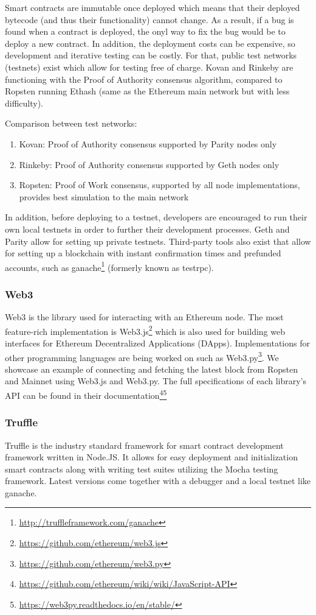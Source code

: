 Smart contracts are immutable once deployed which means that their deployed bytecode (and thus their functionality) cannot change. As a result, if a bug is found when a contract is deployed, the onyl way to fix the bug would be to deploy a new contract. In addition, the deployment costs can be expensive, so development and iterative testing can be costly. For that, public test networks (testnets) exist which allow for testing free of charge. Kovan and Rinkeby are functioning with the Proof of Authority \cite{poa} consensus algorithm, compared to Ropsten running Ethash \cite{ethash} (same as the Ethereum main network but with less difficulty). 

Comparison between test networks:
\begin{enumerate}
    \item Kovan: Proof of Authority consensus supported by Parity nodes only
    \item Rinkeby: Proof of Authority consensus supported by Geth nodes only
    \item Ropsten: Proof of Work consensus, supported by all node implementations, provides best simulation to the main network 
\end{enumerate}

In addition, before deploying to a testnet, developers are encouraged to run their own local testnets in order to further their development processes. Geth and Parity allow for setting up private testnets. Third-party tools also exist that allow for setting up a blockchain with instant confirmation times and prefunded accounts, such as ganache\footnote{\url{http://truffleframework.com/ganache}} (formerly known as testrpc).


\subsubsection{Web3}
Web3 is the library used for interacting with an Ethereum node. The most feature-rich implementation is Web3.js\footnote{\url{https://github.com/ethereum/web3.js}} which is also used for building web interfaces for Ethereum Decentralized Applications (DApps). Implementations for other programming languages are being worked on such as Web3.py\footnote{\url{https://github.com/ethereum/web3.py}}. We showcase an example of connecting and fetching the latest block from Ropsten and Mainnet using Web3.js and Web3.py. The full specifications of each library's API can be found in their documentation\footnote{\url{https://github.com/ethereum/wiki/wiki/JavaScript-API}}\footnote{\url{https://web3py.readthedocs.io/en/stable/}}


\subsubsection{Truffle}
Truffle is the industry standard framework for smart contract development framework written in Node.JS. It allows for easy deployment and initialization smart contracts along with writing test suites utilizing the Mocha testing framework. Latest versions come together with a debugger and a local testnet like ganache. 
